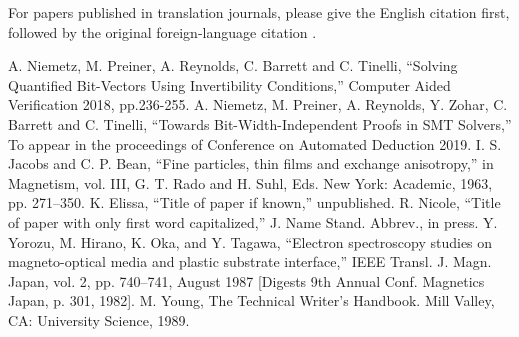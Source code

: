 \documentclass[conference]{IEEEtran}
\begin{document}
For papers published in translation journals, please give the English 
citation first, followed by the original foreign-language citation \cite{b6}.

\begin{thebibliography}{00}
 A. Niemetz, M. Preiner, A. Reynolds, 
C. Barrett and C. Tinelli, ``Solving Quantified Bit-Vectors 
Using Invertibility Conditions,'' Computer Aided Verification 2018, pp.236-255.
 A. Niemetz, M. Preiner, A. Reynolds, 
Y. Zohar, C. Barrett and C. Tinelli, ``Towards Bit-Width-Independent Proofs in SMT Solvers,'' 
To appear in the proceedings of 
Conference on Automated Deduction 2019.
 I. S. Jacobs and C. P. Bean, ``Fine particles, thin films and exchange anisotropy,'' in Magnetism, vol. III, G. T. Rado and H. Suhl, Eds. New York: Academic, 1963, pp. 271--350.
 K. Elissa, ``Title of paper if known,'' unpublished.
 R. Nicole, ``Title of paper with only first word capitalized,'' J. Name Stand. Abbrev., in press.
 Y. Yorozu, M. Hirano, K. Oka, and Y. Tagawa, ``Electron spectroscopy studies on magneto-optical media and plastic substrate interface,'' IEEE Transl. J. Magn. Japan, vol. 2, pp. 740--741, August 1987 [Digests 9th Annual Conf. Magnetics Japan, p. 301, 1982].
 M. Young, The Technical Writer's Handbook. Mill Valley, CA: University Science, 1989.
\end{thebibliography}
\end{document}
